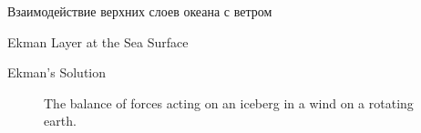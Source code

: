 \begin{chapter}{Взаимодействие верхних слоев океана с ветром}
\begin{section}{Ekman Layer at the Sea Surface}
\begin{paragraph}{Ekman's Solution}
\begin{figure}[t!]
\centering
{}
\caption{The balance of forces acting on an iceberg in a wind on a rotating earth.}
\label{fig:forcesketch}
\vspace{-3ex}
\end{figure}
%
%


\end{paragraph}
\end{section}
\end{chapter}

